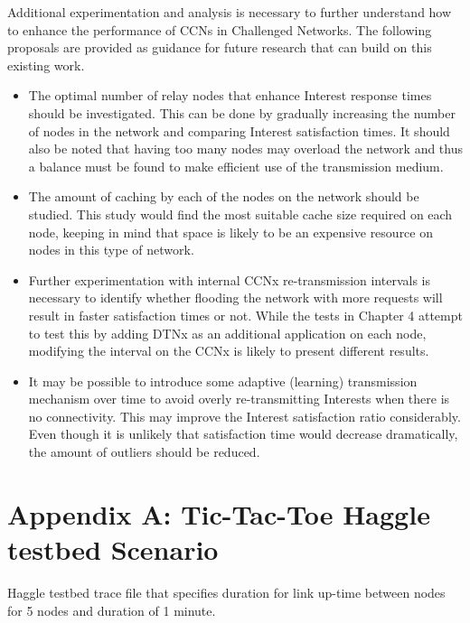 \documentclass[a4paper,12pt]{report}      %
\begin{document}
Additional experimentation and analysis is necessary to further understand how to enhance the performance of CCNs in Challenged Networks. The following proposals are provided as guidance for future research that can build on this existing work.

\begin{itemize}
\item The optimal number of relay nodes that enhance Interest response times should be investigated. This can be done by gradually increasing the number of nodes in the network and comparing Interest satisfaction times. It should also be noted that having too many nodes may overload the network and thus a balance must be found to make efficient use of the transmission medium.

\item The amount of caching by each of the nodes on the network should be studied. This study would find the most suitable cache size required on each node, keeping in mind that space is likely to be an expensive resource on nodes in this type of network.

\item Further experimentation with internal CCNx re-transmission intervals is necessary to identify whether flooding the network with more requests will result in faster satisfaction times or not. While the tests in Chapter 4 attempt to test this by adding DTNx as an additional application on each node, modifying the interval on the CCNx is likely to present different results.

\item It may be possible to introduce some adaptive (learning) transmission mechanism over time to avoid
overly re-transmitting Interests when there is no connectivity. This may improve the Interest satisfaction ratio considerably. Even though it is unlikely that satisfaction time would decrease dramatically, the amount of outliers should be reduced.

\end{itemize}

\pagebreak
{}


\pagebreak
\chapter*{Appendix A: Tic-Tac-Toe Haggle testbed Scenario}

Haggle testbed trace file that specifies duration for link up-time between nodes for 5 nodes and
duration of 1 minute.
\end{document}
